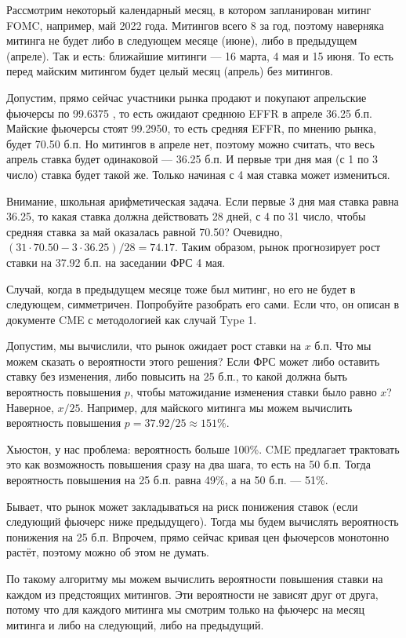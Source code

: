 \documentclass[a4paper,14pt]{extarticle}
\begin{document}
Рассмотрим некоторый календарный месяц, в котором запланирован митинг FOMC, например, май 2022 года. Митингов всего 8 за год, поэтому наверняка митинга не будет либо в следующем 
месяце (июне), либо в предыдущем (апреле). Так и есть: ближайшие митинги --- 16 марта, 
4 мая и 15 июня. То есть перед майским митингом будет целый месяц (апрель) без митингов. 

Допустим, прямо сейчас участники рынка продают и покупают апрельские фьючерсы по 99.6375 , то есть ожидают среднюю EFFR в апреле 36.25 б.п. Майские фьючерсы стоят
99.2950, то есть средняя EFFR, по мнению рынка, будет 70.50 б.п. Но митингов в апреле 
нет, поэтому можно считать, что весь апрель ставка будет одинаковой --- 36.25 б.п. И 
первые три дня мая (с 1 по 3 число) ставка будет такой же. Только начиная с 4 мая ставка 
может измениться.

Внимание, школьная арифметическая задача. Если первые 3 дня мая ставка равна 36.25, 
то какая ставка должна действовать 28 дней, с 4 по 31 число, чтобы средняя ставка за май
оказалась равной 70.50? Очевидно, $(31\cdot70.50 - 3\cdot36.25) / 28 = 74.17$. Таким образом, 
рынок прогнозирует рост ставки на 37.92 б.п. на заседании ФРС 4 мая.

Случай, когда в предыдущем месяце тоже был митинг, но его не будет в следующем, 
симметричен. Попробуйте разобрать его сами. Если что, он описан в документе CME с 
методологией как случай Type 1.

Допустим, мы вычислили, что рынок ожидает рост ставки на $x$ б.п. Что мы можем сказать о 
вероятности этого решения? Если ФРС может либо оставить ставку без изменения, либо 
повысить на 25 б.п., то какой должна быть вероятность повышения $p$, чтобы матожидание изменения
ставки было равно $x$? Наверное, $x / 25$. Например, для майского митинга мы можем 
вычислить вероятность повышения $p = 37.92 / 25 \approx 151\%$.

Хьюстон, у нас проблема: вероятность больше 100\%. CME предлагает трактовать это как 
возможность повышения сразу на два шага, то есть на 50 б.п. Тогда вероятность повышения 
на 25 б.п. равна 49\%, а на 50 б.п. --- 51\%.

Бывает, что рынок может закладываться на риск понижения ставок (если следующий фьючерс 
ниже предыдущего). Тогда мы будем вычислять вероятность понижения на 25 б.п. Впрочем,
прямо сейчас кривая цен фьючерсов монотонно растёт, поэтому можно об этом не думать.

По такому алгоритму мы можем вычислить вероятности повышения ставки на каждом из 
предстоящих митингов. Эти вероятности не зависят друг от друга, потому что для каждого митинга 
мы смотрим только на фьючерс на месяц митинга и либо на следующий, либо на предыдущий.
\end{document}
